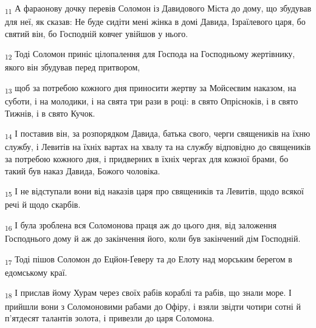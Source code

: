 \begin{tcolorbox}
\textsubscript{11} А фараонову дочку перевів Соломон із Давидового Міста до дому, що збудував для неї, як сказав: Не буде сидіти мені жінка в домі Давида, Ізраїлевого царя, бо святий він, бо Господній ковчег увійшов у нього.
\end{tcolorbox}
\begin{tcolorbox}
\textsubscript{12} Тоді Соломон приніс цілопалення для Господа на Господньому жертівнику, якого він збудував перед притвором,
\end{tcolorbox}
\begin{tcolorbox}
\textsubscript{13} щоб за потребою кожного дня приносити жертву за Мойсеєвим наказом, на суботи, і на молодики, і на свята три рази в році: в свято Опрісноків, і в свято Тижнів, і в свято Кучок.
\end{tcolorbox}
\begin{tcolorbox}
\textsubscript{14} І поставив він, за розпорядком Давида, батька свого, черги священиків на їхню службу, і Левитів на їхніх вартах на хвалу та на службу відповідно до священиків за потребою кожного дня, і придверних в їхніх чергах для кожної брами, бо такий був наказ Давида, Божого чоловіка.
\end{tcolorbox}
\begin{tcolorbox}
\textsubscript{15} І не відступали вони від наказів царя про священиків та Левитів, щодо всякої речі й щодо скарбів.
\end{tcolorbox}
\begin{tcolorbox}
\textsubscript{16} І була зроблена вся Соломонова праця аж до цього дня, від заложення Господнього дому й аж до закінчення його, коли був закінчений дім Господній.
\end{tcolorbox}
\begin{tcolorbox}
\textsubscript{17} Тоді пішов Соломон до Ецйон-Ґеверу та до Елоту над морським берегом в едомському краї.
\end{tcolorbox}
\begin{tcolorbox}
\textsubscript{18} І прислав йому Хурам через своїх рабів кораблі та рабів, що знали море. І прийшли вони з Соломоновими рабами до Офіру, і взяли звідти чотири сотні й п'ятдесят талантів золота, і привезли до царя Соломона.
\end{tcolorbox}
